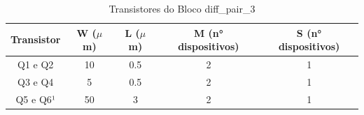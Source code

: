 \begin{table}[htbp]
\caption{Transistores do Bloco diff\_pair\_3}
\label{pard_diff3}
\centering
\begin{tabular}{ccccc}
\toprule
Transistor & W ($\mu$m)  & L ($\mu$m)           & M (n° dispositivos) & S (n° dispositivos)\\
\midrule \midrule
Q1 e Q2 & 10 & 0.5 & 2 & 1\\
\midrule
Q3 e Q4 & 5 & 0.5 & 2 & 1\\
\midrule
Q5 e Q6¹ & 50 & 3 & 2 & 1\\

\bottomrule
\end{tabular}
\end{table}
\clearpage